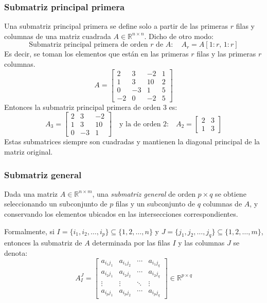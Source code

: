 \subsubsection{Submatriz principal primera}

Una submatriz principal primera se define solo a partir de las primeras \(r\) filas y columnas de una matriz cuadrada \(A\in\mathbb{R}^{n\times n}\).
Dicho de otro modo:
\[
\text{Submatriz principal primera de orden } r \text{ de } A: \quad A_r = A[1\!:\!r,\,1\!:\!r]
\]
Es decir, se toman los elementos que están en las primeras \(r\) filas y las primeras \(r\) columnas.
\[
A = \begin{bmatrix}
2 & 3 & -2 & 1\\
1 & 3 & 10 & 2\\
0 & -3 & 1 & 5\\
-2 & 0 & -2 & 5
\end{bmatrix}
\]
Entonces la submatriz principal primera de orden 3 es:
\[
A_3 = \begin{bmatrix}
2 & 3 & -2 \\
1 & 3 & 10\\
0 & -3 & 1
\end{bmatrix} \quad \text{y la de orden 2:} \quad
A_2 = \begin{bmatrix}
2 & 3 \\
1 & 3
\end{bmatrix}
\]
Estas submatrices siempre son cuadradas y mantienen la diagonal principal de la matriz original.

\subsubsection{Submatriz general}

Dada una matriz \(A \in \mathbb{R}^{n \times m}\), una \textit{submatriz general} de orden \(p \times q\) se obtiene seleccionando un subconjunto de \(p\) filas y un subconjunto de \(q\) columnas de \(A\), y conservando los elementos ubicados en las intersecciones correspondientes.

Formalmente, si \(I = \{i_1, i_2, \ldots, i_p\} \subseteq \{1, 2, \ldots, n\}\) y \(J = \{j_1, j_2, \ldots, j_q\} \subseteq \{1, 2, \ldots, m\}\), entonces la submatriz de \(A\) determinada por las filas \(I\) y las columnas \(J\) se denota:
\[
A^{J}_{I} = 
\begin{bmatrix}
a_{i_1 j_1} & a_{i_1 j_2} & \cdots & a_{i_1 j_q} \\
a_{i_2 j_1} & a_{i_2 j_2} & \cdots & a_{i_2 j_q} \\
\vdots & \vdots & \ddots & \vdots \\
a_{i_p j_1} & a_{i_p j_2} & \cdots & a_{i_p j_q}
\end{bmatrix}
\in \mathbb{R}^{p \times q}
\]


